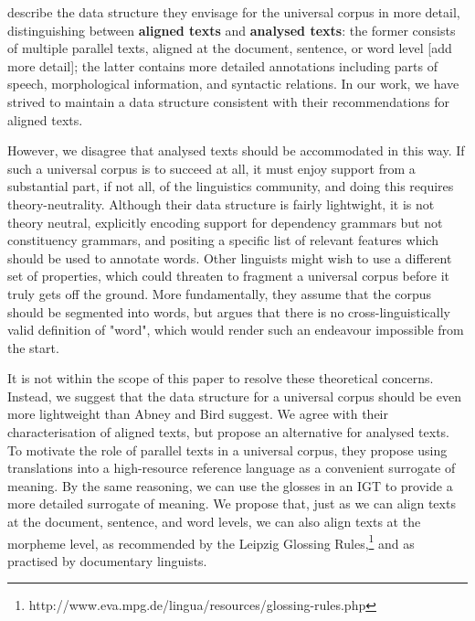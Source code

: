  describe the data structure they envisage for the universal corpus in more detail, distinguishing between \textbf{aligned texts} and \textbf{analysed texts}: the former consists of multiple parallel texts, aligned at the document, sentence, or word level [add more detail]; the latter contains more detailed annotations including parts of speech, morphological information, and syntactic relations. In our work, we have strived to maintain a data structure consistent with their recommendations for aligned texts.

However, we disagree that analysed texts should be accommodated in this way. If such a universal corpus is to succeed at all, it must enjoy support from a substantial part, if not all, of the linguistics community, and doing this requires theory-neutrality. Although their data structure is fairly lightwight, it is not theory neutral, explicitly encoding support for dependency grammars but not constituency grammars, and positing a specific list of relevant features which should be used to annotate words. Other linguists might wish to use a different set of properties, which could threaten to fragment a universal corpus before it truly gets off the ground. More fundamentally, they assume that the corpus should be segmented into words, but  argues that there is no cross-linguistically valid definition of "word", which would render such an endeavour impossible from the start.

It is not within the scope of this paper to resolve these theoretical concerns. Instead, we suggest that the data structure for a universal corpus should be even more lightweight than Abney and Bird suggest. We agree with their characterisation of aligned texts, but propose an alternative for analysed texts. To motivate the role of parallel texts in a universal corpus, they propose using translations into a high-resource reference language as a convenient surrogate of meaning. By the same reasoning, we can use the glosses in an IGT to provide a more detailed surrogate of meaning. We propose that, just as we can align texts at the document, sentence, and word levels, we can also align texts at the morpheme level, as recommended by the Leipzig Glossing Rules,\footnote{http://www.eva.mpg.de/lingua/resources/glossing-rules.php} and as practised by documentary linguists.

